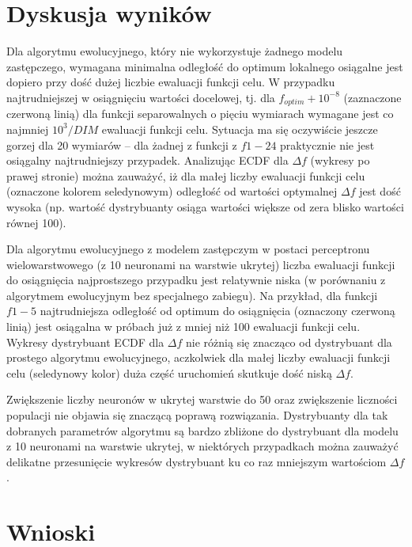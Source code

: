 \documentclass[runningheads]{llncs}
\begin{document}
\section{Dyskusja wyników}

Dla algorytmu ewolucyjnego, który nie wykorzystuje żadnego modelu zastępczego, 
wymagana minimalna odległość do optimum lokalnego osiągalne jest dopiero przy 
dość dużej liczbie ewaluacji funkcji celu. W przypadku najtrudniejszej w 
osiągnięciu wartości docelowej, tj. dla $f_{optim} + 10^{-8}$ (zaznaczone 
czerwoną linią) dla funkcji separowalnych o pięciu wymiarach wymagane jest co 
najmniej $10^3/DIM$ ewaluacji funkcji celu. Sytuacja ma się oczywiście jeszcze 
gorzej dla 20 wymiarów -- dla żadnej z funkcji z $f1-24$ praktycznie nie jest 
osiągalny najtrudniejszy przypadek. Analizując ECDF dla $\Delta f$ (wykresy po 
prawej stronie) można zauważyć, iż dla małej liczby ewaluacji funkcji celu 
(oznaczone kolorem seledynowym) odległość od wartości optymalnej $\Delta f$ 
jest dość wysoka (np. wartość dystrybuanty osiąga wartości większe od zera 
blisko wartości równej 100). 

Dla algorytmu ewolucyjnego z modelem zastępczym w postaci perceptronu 
wielowarstwowego (z 10 neuronami na warstwie ukrytej) liczba ewaluacji funkcji 
do osiągnięcia najprostszego przypadku jest relatywnie niska (w porównaniu z 
algorytmem ewolucyjnym bez specjalnego zabiegu). Na przykład, dla funkcji 
$f1-5$ najtrudniejsza odległość od optimum do osiągnięcia (oznaczony czerwoną 
linią) jest osiągalna w próbach już z mniej niż 100 ewaluacji funkcji celu. 
Wykresy dystrybuant ECDF dla $\Delta f$ nie różnią się znacząco 
od dystrybuant dla prostego algorytmu ewolucyjnego, aczkolwiek dla małej liczby 
ewaluacji funkcji celu (seledynowy kolor) duża część uruchomień skutkuje dość 
niską $\Delta f$.

Zwiększenie liczby neuronów w ukrytej warstwie do 50 oraz zwiększenie liczności 
populacji nie objawia się znaczącą poprawą rozwiązania. Dystrybuanty dla tak 
dobranych parametrów algorytmu są bardzo zbliżone do dystrybuant dla modelu z 
10 neuronami na warstwie ukrytej, w niektórych przypadkach można zauważyć 
delikatne przesunięcie wykresów dystrybuant ku co raz mniejszym wartościom 
$\Delta f$. 
\section{Wnioski}
\end{document}
